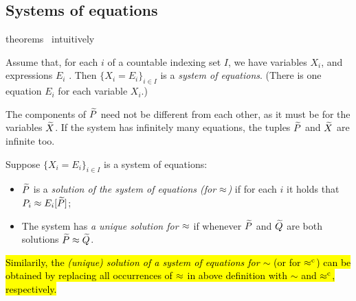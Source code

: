 \subsection{Systems of equations}
\label{ss:SysEq}
  theorems~\cite{Mil89} intuitively

\begin{definition}[equations] %
  \label{def:equation}
Assume that, for each $i$ of 
 a countable indexing set $I$, we have variables $X_i$, and expressions
$E_i$ . Then 
$\{ X_i = E_i\}_{i\in I}$ is 
  a \emph{system of equations}. (There is one equation $E_i$ for each variable $X_i$.)
\end{definition}

The components of $\widetilde P$ need not be
different from each other, as it must be for the variables $\widetilde X$.
If the system has infinitely many equations, the  tuples $\widetilde P$ and $\widetilde X$ are infinite too.

\begin{definition}
  \label{def:solution}
Suppose $\{ X_i = E_i\}_{i\in I}$ is a system of equations: 
\begin{itemize}
\item
 $\widetilde P$ is a \emph{solution of the system of equations (for $\approx$)} 
if for each $i$ it holds that $P_i \approx E_i [\widetilde P]$;
\item The system has \emph{a unique solution for $\approx$}  if whenever 
 $\widetilde P$ and $\widetilde Q$ are both solutions  $\widetilde P \approx \widetilde Q$. 
\end{itemize} 
 \end{definition}
\hl{Similarily, the \emph{(unique) solution of a system of equations for $\sim$}
(or for $\mathrel{\approx^{\rm{c}}}$) can be obtained by replacing all occurrences of $\approx$
in above definition with $\sim$ and $\mathrel{\approx^{\rm{c}}}$, respectively.}

